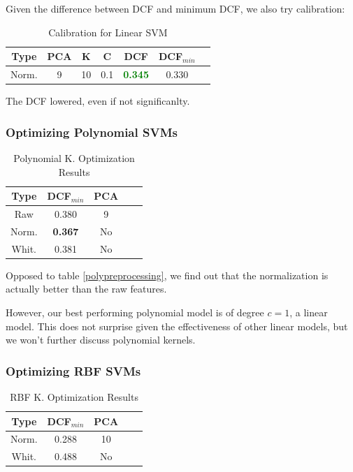 \documentclass[hidelinks, 12pt, twocolumn]{article}
\begin{document}
Given the difference between DCF and minimum DCF, we also try calibration:

\begin{table}[H] 
    \centering
    \small
    \begin{tabular}{||c|c|c|c|c|c|c||}
        \hline
        Type & PCA & K & C & DCF & DCF$_{min}$ \\
        \hline
        \hline
        Norm. & 9 & 10 & 0.1 & \textcolor{green}{\bf 0.345} & 0.330 \\
        \hline
    \end{tabular}
    \caption{Calibration for Linear SVM}
\end{table}

The DCF lowered, even if not significanlty.

\subsubsection{Optimizing Polynomial SVMs}

\begin{table}[H] 
    \centering
    \begin{tabular}{||c|c|c|c|c||}
        \hline
        Type & DCF$_{min}$ & PCA \\
        \hline
        \hline
        Raw   & 0.380 & 9 \\
        Norm. & {\bf 0.367} & No \\
        Whit. & 0.381 & No \\
        \hline
    \end{tabular}
    \caption{Polynomial K. Optimization Results}
    \label{tab:polyoptimization}
\end{table}

Opposed to table \ref{polypreprocessing}, we find out that the normalization is actually better than the raw features.

However, our best performing polynomial model is of degree $ c = 1 $, a linear model.
This does not surprise given the effectiveness of other linear models, but we won't further discuss polynomial kernels.

\subsubsection{Optimizing RBF SVMs}

\begin{table}[H] 
    \centering
    \begin{tabular}{||c|c|c|c|c||}
        \hline
        Type & DCF$_{min}$ & PCA \\
        \hline
        \hline
        Norm. & 0.288 & 10 \\
        Whit. & 0.488 & No \\
        \hline
    \end{tabular}
    \caption{RBF K. Optimization Results}
    \label{tab:rbfoptimization}
\end{table}
\end{document}
